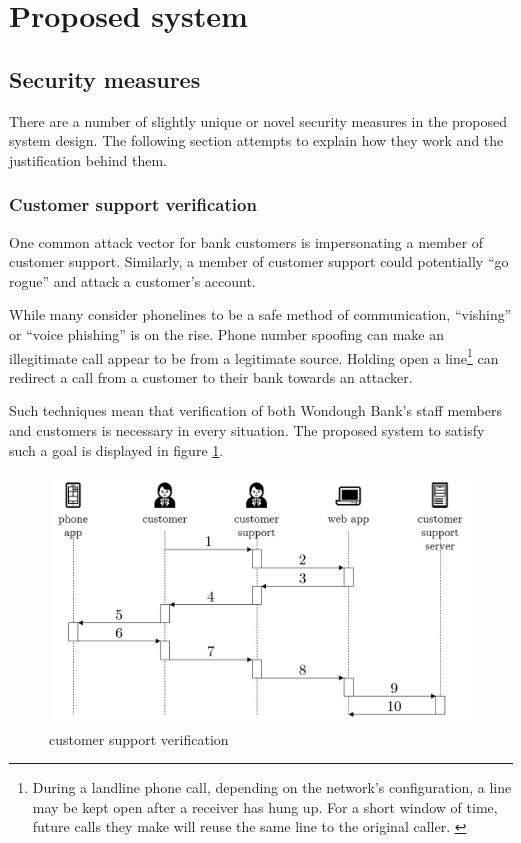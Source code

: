 \section{Proposed system}



\subsection{Security measures}

There are a number of slightly unique or novel security measures in the proposed system design. The following section attempts to explain how they work and the justification behind them.

\subsubsection{Customer support verification}

One common attack vector for bank customers is impersonating a member of customer support. Similarly, a member of customer support could potentially “go rogue” and attack a customer’s account.

While many consider phonelines to be a safe method of communication, “vishing” or “voice phishing” is on the rise. \cite{bbcPhone} \cite{bbcSmishing} Phone number spoofing can make an illegitimate call appear to be from a legitimate source. Holding open a line\footnote{
    During a landline phone call, depending on the network’s configuration, a line may be kept open after a receiver has hung up. For a short window of time, future calls they make will reuse the same line to the original caller. \cite{conArtists}
} can redirect a call from a customer to their bank towards an attacker.

Such techniques mean that verification of both Wondough Bank’s staff members and customers is necessary in every situation. The proposed system to satisfy such a goal is displayed in figure \ref{customerSupport}.

\begin{figure}
    \includegraphics[width=\columnwidth]{images/customer-support}
    \caption{customer support verification}
    \centering
    \label{customerSupport}
\end{figure}


